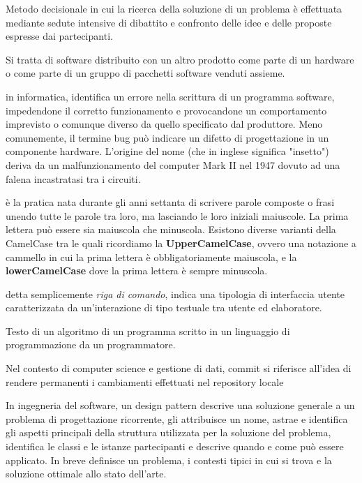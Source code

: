 \documentclass{scalatekids-article}
\begin{document}
 Metodo decisionale in cui la ricerca della soluzione di un problema è effettuata mediante sedute intensive di dibattito e confronto delle idee e delle proposte espresse dai partecipanti.

 Si tratta di software distribuito con un altro prodotto come parte di un hardware o come parte di un gruppo di pacchetti software venduti assieme.

 in informatica, identifica un errore nella scrittura di un programma software, impedendone il corretto funzionamento e provocandone un comportamento imprevisto o comunque diverso da quello specificato dal produttore. Meno comunemente, il termine bug può indicare un difetto di progettazione in un componente hardware.
L'origine del nome (che in inglese significa "insetto") deriva da un malfunzionamento del computer Mark II nel 1947 dovuto ad una falena incastratasi tra i circuiti.


 è la pratica nata durante gli anni settanta di scrivere parole composte o frasi unendo tutte le parole tra loro, ma lasciando le loro iniziali maiuscole. La prima lettera può essere sia maiuscola che minuscola.
Esistono diverse varianti della CamelCase tra le quali ricordiamo la \textbf{UpperCamelCase}, ovvero una notazione a cammello in cui la prima lettera è obbligatoriamente maiuscola, e la \textbf{lowerCamelCase} dove la prima lettera è sempre minuscola.

 detta semplicemente \textit{riga di comando}, indica una tipologia di interfaccia utente caratterizzata da un'interazione di tipo testuale tra utente ed elaboratore.

 Testo di un algoritmo di un programma scritto in un linguaggio di programmazione da un programmatore.

 Nel contesto di computer science e gestione di dati, commit si riferisce all'idea di rendere permanenti i cambiamenti effettuati nel repository locale



 In ingegneria del software, un design pattern descrive una soluzione generale a un problema di progettazione ricorrente, gli attribuisce un nome, astrae e identifica gli aspetti principali della struttura utilizzata per la soluzione del problema, identifica le classi e le istanze partecipanti e descrive quando e come può essere applicato. In breve definisce un problema, i contesti tipici in cui si trova e la soluzione ottimale allo stato dell'arte.
\end{document}
